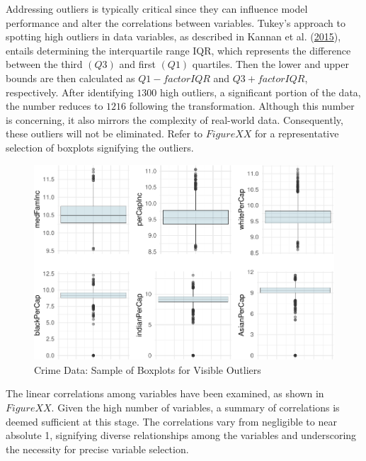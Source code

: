 \documentclass[
  11pt,
]{article}
\begin{document}
Addressing outliers is typically critical since they can influence model
performance and alter the correlations between variables. Tukey's
approach to spotting high outliers in data variables, as described in
Kannan et al. (\protect\hyperlink{ref-Kannan2015}{2015}), entails
determining the interquartile range IQR, which represents the difference
between the third \((Q3)\) and first \((Q1)\) quartiles. Then the lower
and upper bounds are then calculated as \(Q1 - factorIQR\) and
\(Q3 + factorIQR\), respectively. After identifying \(1300\) high
outliers, a significant portion of the data, the number reduces to
\(1216\) following the transformation. Although this number is
concerning, it also mirrors the complexity of real-world data.
Consequently, these outliers will not be eliminated. Refer to
\(Figure XX\) for a representative selection of boxplots signifying the
outliers.

\begin{figure}[H]

{\centering \includegraphics[width=0.75\linewidth]{dissertation_files/figure-latex/Box Plot-1} 

}

\caption{Crime Data: Sample of Boxplots for Visible Outliers}\label{fig:Box Plot}
\end{figure}

The linear correlations among variables have been examined, as shown in
\(Figure XX\). Given the high number of variables, a summary of
correlations is deemed sufficient at this stage. The correlations vary
from negligible to near absolute 1, signifying diverse relationships
among the variables and underscoring the necessity for precise variable
selection.
\end{document}
